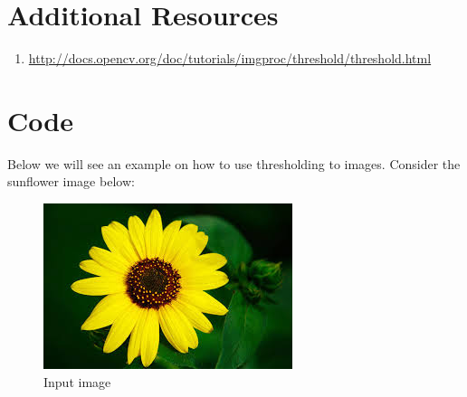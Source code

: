 \documentclass[]{article}
\providecommand{\tightlist}{%
  \setlength{\itemsep}{0pt}\setlength{\parskip}{0pt}}
\begin{document}
\section{Additional Resources}\label{additional-resources}

\begin{enumerate}
	\def\labelenumi{\arabic{enumi})}
	\tightlist
	\item
	\url{http://docs.opencv.org/doc/tutorials/imgproc/threshold/threshold.html}
\end{enumerate}


\section{Code}\label{code}

Below we will see an example on how to use thresholding to images.
Consider the sunflower image below:
\begin{figure}[h]
	\centering
	\includegraphics{sun.jpg}
	\caption{Input image}
\end{figure}
\end{document}
